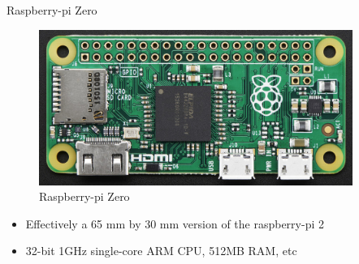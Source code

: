 \begin{frame}
   {Raspberry-pi Zero}
   \begin{figure}[H]
      \includegraphics[height=2in]{IMAGES/rpi0}
      \caption{Raspberry-pi Zero}
   \end{figure}
   \begin{itemize}
      \item Effectively a 65 mm by 30 mm version of the raspberry-pi 2
      \item 32-bit 1GHz single-core ARM CPU, 512MB RAM, etc
   \end{itemize}
\end{frame}

\cprotect{}

